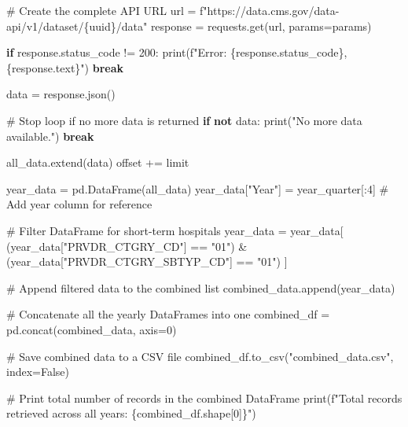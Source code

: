 \documentclass[
  letterpaper,
  DIV=11,
  numbers=noendperiod]{scrartcl}
\newenvironment{Shaded}{\begin{snugshade}}{\end{snugshade}}
\newcommand{\BuiltInTok}[1]{\textcolor[rgb]{0.00,0.23,0.31}{#1}}
\newcommand{\CommentTok}[1]{\textcolor[rgb]{0.37,0.37,0.37}{#1}}
\newcommand{\ControlFlowTok}[1]{\textcolor[rgb]{0.00,0.23,0.31}{\textbf{#1}}}
\newcommand{\DecValTok}[1]{\textcolor[rgb]{0.68,0.00,0.00}{#1}}
\newcommand{\KeywordTok}[1]{\textcolor[rgb]{0.00,0.23,0.31}{\textbf{#1}}}
\newcommand{\NormalTok}[1]{\textcolor[rgb]{0.00,0.23,0.31}{#1}}
\newcommand{\OperatorTok}[1]{\textcolor[rgb]{0.37,0.37,0.37}{#1}}
\newcommand{\SpecialCharTok}[1]{\textcolor[rgb]{0.37,0.37,0.37}{#1}}
\newcommand{\SpecialStringTok}[1]{\textcolor[rgb]{0.13,0.47,0.30}{#1}}
\newcommand{\StringTok}[1]{\textcolor[rgb]{0.13,0.47,0.30}{#1}}
\newcommand{\VariableTok}[1]{\textcolor[rgb]{0.07,0.07,0.07}{#1}}
\begin{document}
\begin{Shaded}
\begin{Highlighting}[]
        \CommentTok{\# Create the complete API URL}
\NormalTok{        url }\OperatorTok{=} \SpecialStringTok{f"https://data.cms.gov/data{-}api/v1/dataset/}\SpecialCharTok{\{}\NormalTok{uuid}\SpecialCharTok{\}}\SpecialStringTok{/data"}
\NormalTok{        response }\OperatorTok{=}\NormalTok{ requests.get(url, params}\OperatorTok{=}\NormalTok{params)}

        \ControlFlowTok{if}\NormalTok{ response.status\_code }\OperatorTok{!=} \DecValTok{200}\NormalTok{:}
            \BuiltInTok{print}\NormalTok{(}\SpecialStringTok{f"Error: }\SpecialCharTok{\{}\NormalTok{response}\SpecialCharTok{.}\NormalTok{status\_code}\SpecialCharTok{\}}\SpecialStringTok{, }\SpecialCharTok{\{}\NormalTok{response}\SpecialCharTok{.}\NormalTok{text}\SpecialCharTok{\}}\SpecialStringTok{"}\NormalTok{)}
            \ControlFlowTok{break}

\NormalTok{        data }\OperatorTok{=}\NormalTok{ response.json()}

        \CommentTok{\# Stop loop if no more data is returned}
        \ControlFlowTok{if} \KeywordTok{not}\NormalTok{ data:}
            \BuiltInTok{print}\NormalTok{(}\StringTok{"No more data available."}\NormalTok{)}
            \ControlFlowTok{break}

\NormalTok{        all\_data.extend(data)}
\NormalTok{        offset }\OperatorTok{+=}\NormalTok{ limit}

\NormalTok{    year\_data }\OperatorTok{=}\NormalTok{ pd.DataFrame(all\_data)}
\NormalTok{    year\_data[}\StringTok{"Year"}\NormalTok{] }\OperatorTok{=}\NormalTok{ year\_quarter[:}\DecValTok{4}\NormalTok{]  }\CommentTok{\# Add year column for reference}

    \CommentTok{\# Filter DataFrame for short{-}term hospitals}
\NormalTok{    year\_data }\OperatorTok{=}\NormalTok{ year\_data[}
\NormalTok{        (year\_data[}\StringTok{"PRVDR\_CTGRY\_CD"}\NormalTok{] }\OperatorTok{==} \StringTok{"01"}\NormalTok{) }\OperatorTok{\&}
\NormalTok{        (year\_data[}\StringTok{"PRVDR\_CTGRY\_SBTYP\_CD"}\NormalTok{] }\OperatorTok{==} \StringTok{"01"}\NormalTok{)}
\NormalTok{    ]}

    \CommentTok{\# Append filtered data to the combined list}
\NormalTok{    combined\_data.append(year\_data)}

\CommentTok{\# Concatenate all the yearly DataFrames into one}
\NormalTok{combined\_df }\OperatorTok{=}\NormalTok{ pd.concat(combined\_data, axis}\OperatorTok{=}\DecValTok{0}\NormalTok{)}

\CommentTok{\# Save combined data to a CSV file}
\NormalTok{combined\_df.to\_csv(}\StringTok{"combined\_data.csv"}\NormalTok{, index}\OperatorTok{=}\VariableTok{False}\NormalTok{)}

\CommentTok{\# Print total number of records in the combined DataFrame}
\BuiltInTok{print}\NormalTok{(}\SpecialStringTok{f"Total records retrieved across all years: }\SpecialCharTok{\{}\NormalTok{combined\_df}\SpecialCharTok{.}\NormalTok{shape[}\DecValTok{0}\NormalTok{]}\SpecialCharTok{\}}\SpecialStringTok{"}\NormalTok{)}
\end{Highlighting}
\end{Shaded}
\end{document}
